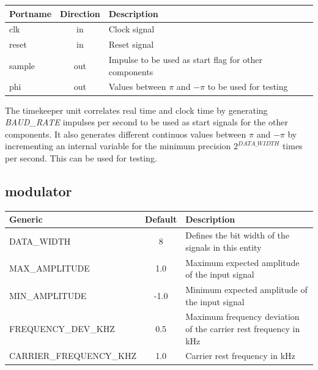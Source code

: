 \begin{center}
	\begin{tabular}{ | l | c | l | }
		\hline
		\textbf{Portname} & \textbf{Direction} & \textbf{Description} \\
		\hline
		clk & in & Clock signal \\
		reset & in  & Reset signal \\
		sample & out  & Impulse to be used as start flag for other components \\
		phi & out  & Values between $\pi$ and $-\pi$ to be used for testing \\
		\hline
	\end{tabular} 
\end{center}

The timekeeper unit correlates real time and clock time by generating \textit{BAUD\_RATE} impulses per second to be used as start signals for the other components. It also generates 
different continuos values between $\pi$ and $-\pi$ by incrementing an internal variable for the minimum precision $2^{DATA\_WIDTH}$ times per second. This can be used for testing.


\subsection{modulator}

\begin{adjustwidth}{-2.7cm}{}
	\begin{center}
		\begin{tabular}{ | l | c | l | }
			\hline
			\textbf{Generic} & \textbf{Default} & \textbf{Description} \\ \hline
			DATA\_WIDTH & 8 & Defines the bit width of the signals in this entity \\
			MAX\_AMPLITUDE & 1.0 & Maximum expected amplitude of the input signal \\
			MIN\_AMPLITUDE & -1.0 & Minimum expected amplitude of the input signal \\
			FREQUENCY\_DEV\_KHZ & 0.5 & Maximum frequency deviation of the carrier rest frequency in kHz \\
			CARRIER\_FREQUENCY\_KHZ & 1.0 & Carrier rest frequency in kHz \\
			\hline
		\end{tabular} 
	\end{center}
\end{adjustwidth}

\vspace{5mm}

